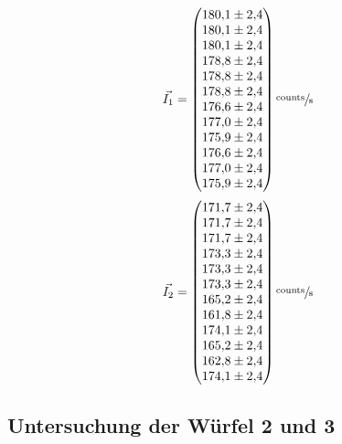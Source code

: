 \begin{equation}
	\vec{I_1}=
	\begin{pmatrix}
		\num{180.1 \pm 2.4} \\
		\num{180.1 \pm 2.4} \\
		\num{180.1\pm 2.4} \\
		\num{178.8\pm 2.4} \\
		\num{178.8\pm 2.4} \\
		\num{178.8\pm 2.4} \\
		\num{176.6\pm 2.4} \\
		\num{177.0\pm 2.4} \\
		\num{175.9\pm 2.4} \\
    \num{176.6\pm 2.4} \\
    \num{177.0\pm 2.4} \\
    \num{175.9\pm 2.4} \\
	\end{pmatrix}
    \sfrac{\text{counts}}{\text{s}}
	\label{eq:vecleer1}
\end{equation}
\begin{equation}
	\vec{I_2}=
	\begin{pmatrix}
		\num{171.7 \pm 2.4} \\
		\num{171.7 \pm 2.4} \\
		\num{171.7\pm 2.4} \\
		\num{173.3\pm 2.4} \\
		\num{173.3\pm 2.4} \\
		\num{173.3\pm 2.4} \\
		\num{165.2\pm 2.4} \\
		\num{161.8\pm 2.4} \\
		\num{174.1\pm 2.4} \\
    \num{165.2\pm 2.4} \\
    \num{162.8\pm 2.4} \\
    \num{174.1\pm 2.4} \\
	\end{pmatrix}
    \sfrac{\text{counts}}{\text{s}}
	\label{eq:vecleer2}
\end{equation}
\subsection{Untersuchung der Würfel 2 und 3}
